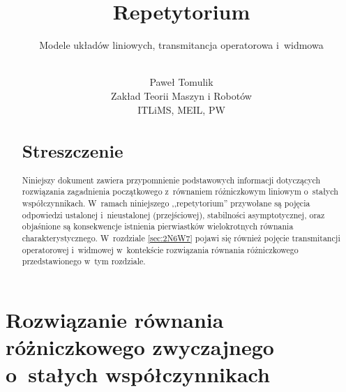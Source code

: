 \documentclass[paper=a4,DIV=12]{lpas}
\begin{document}

\title{\Large{Repetytorium}}

\subtitle{\huge{Modele układów liniowych, transmitancja operatorowa i~widmowa}}

\author{\\Paweł Tomulik\\ Zakład Teorii Maszyn i Robotów\\ ITLiMS, MEIL, PW}
\date{}
\maketitle
\thispagestyle{empty}

\pagebreak
\tableofcontents
\pagebreak

\begin{abstract}
\section{Streszczenie}
  \noindent Niniejszy dokument zawiera przypomnienie podstawowych informacji
  dotyczących rozwiązania zagadnienia początkowego z~równaniem różniczkowym
  liniowym o~stałych współczynnikach. W~ramach niniejszego ,,repetytorium''
  przywołane są pojęcia odpowiedzi ustalonej i~nieustalonej (przejściowej),
  stabilności asymptotycznej, oraz objaśnione są konsekwencje istnienia
  pierwiastków wielokrotnych równania charakterystycznego. W~rozdziale
  \ref{sec:2N6W7} pojawi się również pojęcie transmitancji operatorowej
  i~widmowej w~kontekście rozwiązania równania różniczkowego przedstawionego
  w~tym rozdziale.
\end{abstract}


\section{Rozwiązanie równania różniczkowego zwyczajnego o~stałych
         współczynnikach}
\label{sec:BVHF3}
\end{document}
